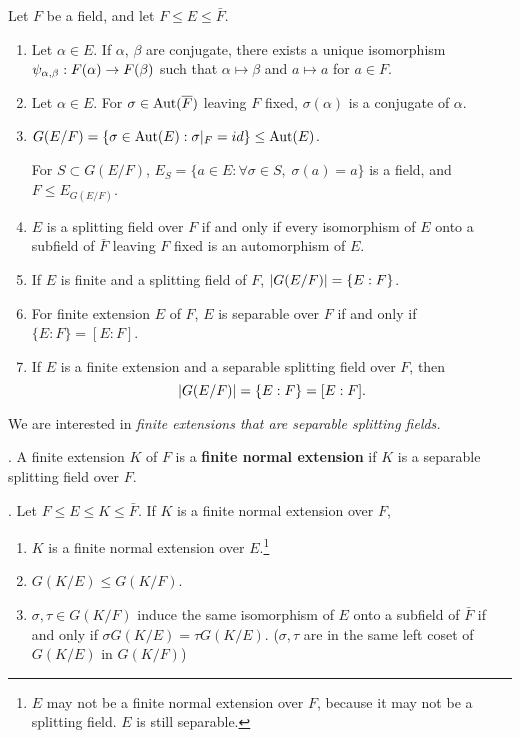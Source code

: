 \recall Let \(F\) be a field, and let \(F \leq E \leq \bar{F}\).
\begin{enumerate}
    \item Let \(\alpha \in E\). If \(\alpha\), \(\beta\) are conjugate, there exists a unique isomorphism \(\psi_{\alpha, \beta} : F(\alpha) \rightarrow F(\beta)\) such that \(\alpha \mapsto \beta\) and \(a \mapsto a\) for \(a \in F\).

    \item Let \(\alpha \in E\). For \(\sigma \in \Aut(\bar{F})\) leaving \(F\) fixed, \(\sigma(\alpha)\) is a conjugate of \(\alpha\).

    \item \(G(E/F) = \{\sigma \in \mathrm{Aut}(E) : \sigma |_F = id\} \leq \mathrm{Aut}(E)\).

          For \(S \subset G(E/F)\), \(E_S = \{a \in E : \forall \sigma \in S,\; \sigma(a) = a\}\) is a field, and \(F \leq E_{G(E/F)}\).

    \item \(E\) is a splitting field over \(F\) if and only if every isomorphism of \(E\) onto a subfield of \(\bar{F}\) leaving \(F\) fixed is an automorphism of \(E\).

    \item If \(E\) is finite and a splitting field of \(F\), \(\left| G(E/F) \right| = \{E : F\}\).

    \item For finite extension \(E\) of \(F\), \(E\) is separable over \(F\) if and only if \(\{E : F\} = [E : F]\).

    \item If \(E\) is a finite extension and a separable splitting field over \(F\), then
          \[
              \left| G(E/F) \right| = \{E : F\} = [E : F].
          \]
\end{enumerate}

We are interested in \textit{finite extensions that are separable splitting fields.}

.  A finite extension \(K\) of \(F\) is a \textbf{finite normal extension} if \(K\) is a separable splitting field over \(F\).

\thm. Let \(F \leq E \leq K \leq \bar{F}\). If \(K\) is a finite normal extension over \(F\),
\begin{enumerate}
    \item \(K\) is a finite normal extension over \(E\).\footnote{\(E\) may not be a finite normal extension over \(F\), because it may not be a splitting field. \(E\) is still separable.}
    \item \(G(K/E) \leq G(K/F)\).
    \item \(\sigma, \tau \in G(K/F)\) induce the same isomorphism of \(E\) onto a subfield of \(\bar{F}\) if and only if \(\sigma G(K/E) = \tau G(K/E)\). (\(\sigma, \tau\) are in the same left coset of \(G(K/E)\) in \(G(K/F)\))
\end{enumerate}

